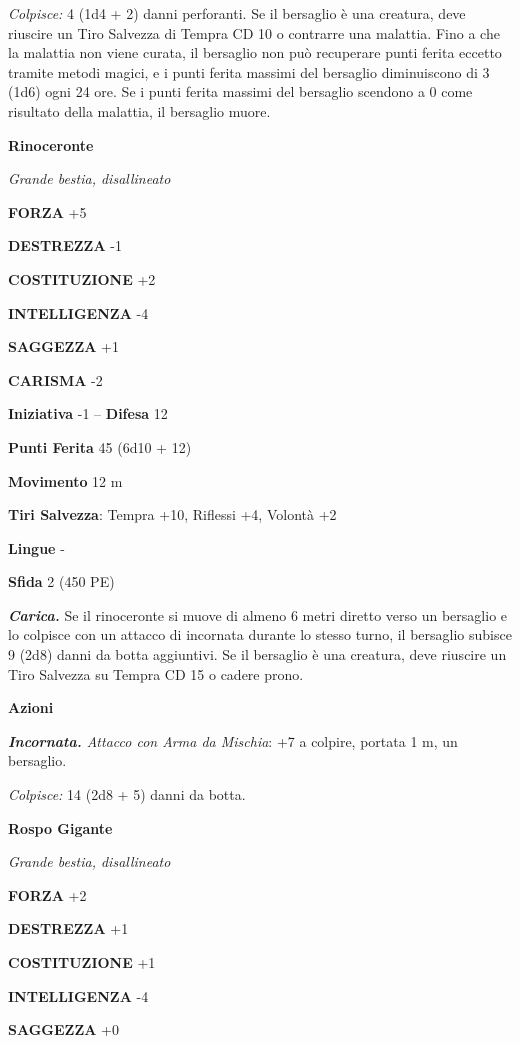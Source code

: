 \begin{multicols}{2}
\emph{Colpisce:} 4 (1d4 + 2) danni perforanti. Se il bersaglio è una creatura, deve riuscire un Tiro Salvezza di Tempra CD 10 o contrarre una malattia. Fino a che la malattia non viene curata, il bersaglio non può recuperare punti ferita eccetto tramite metodi magici, e i punti ferita massimi del bersaglio diminuiscono di 3 (1d6) ogni 24 ore. Se i punti ferita massimi del bersaglio scendono a 0 come risultato della malattia, il bersaglio muore.

\medskip\textbf{Rinoceronte}

\emph{Grande bestia, disallineato}

\textbf{FORZA} +5

\textbf{DESTREZZA} -1

\textbf{COSTITUZIONE} +2

\textbf{INTELLIGENZA} -4

\textbf{SAGGEZZA} +1

\textbf{CARISMA} -2

\textbf{Iniziativa} -1 -- \textbf{Difesa} 12

\textbf{Punti Ferita} 45 (6d10 + 12)

\textbf{Movimento} 12 m

\textbf{Tiri Salvezza}: Tempra +10, Riflessi +4, Volontà +2

\textbf{Lingue} -

\textbf{Sfida} 2 (450 PE)

\emph{\textbf{Carica.}} Se il rinoceronte si muove di almeno 6 metri diretto verso un bersaglio e lo colpisce con un attacco di incornata durante lo stesso turno, il bersaglio subisce 9 (2d8) danni da botta aggiuntivi. Se il bersaglio è una creatura, deve riuscire un Tiro Salvezza su Tempra CD 15 o cadere prono.

\textbf{Azioni}

\emph{\textbf{Incornata.} Attacco con Arma da Mischia}: +7 a colpire, portata 1 m, un bersaglio.

\emph{Colpisce:} 14 (2d8 + 5) danni da botta.

\medskip\textbf{Rospo Gigante}

\emph{Grande bestia, disallineato}

\textbf{FORZA} +2

\textbf{DESTREZZA} +1

\textbf{COSTITUZIONE} +1

\textbf{INTELLIGENZA} -4

\textbf{SAGGEZZA} +0


\end{multicols}

